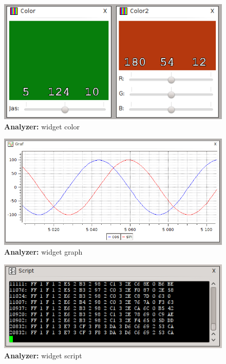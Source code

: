 \documentclass[12pt, a4paper, oneside]{article}
\newcommand{\B}{\textbf} %
\begin{document}
\begin{figure}[H]
\begin{center}
\includegraphics{../img/w_col.png}
\caption{\B{Analyzer:} widget color}
\end{center}
\end{figure}

\begin{figure}[h]
\begin{center}
\includegraphics[scale=0.7]{../img/w_graph.png}
\caption{\B{Analyzer:} widget graph}
\end{center}
\end{figure}

\begin{figure}[h]
\begin{center}
\includegraphics[scale=1.0]{../img/w_script.png}
\caption{\B{Analyzer:} widget script}
\label{script_w}
\end{center}
\end{figure}
\end{document}
